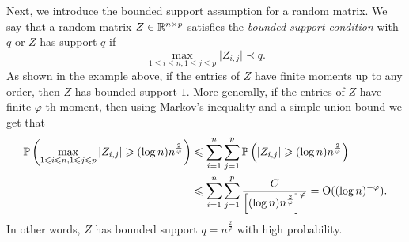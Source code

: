 
Next, we introduce the bounded support assumption for a random matrix.
We say that a random matrix $Z \in\mathbb{R}^{n \times p}$ satisfies the {\it{bounded support condition}} with $q$ or $Z$ has support $q$ if
\begin{equation}
	\max_{1\le i \le n, 1 \le j \le p}\vert Z_{i, j} \vert \prec q. \label{eq_support}
\end{equation}
As shown in the example above, if the entries of $Z$ have finite moments up to any order, then $Z$ has bounded support $1$.
More generally, if the entries of $Z$ have finite $\varphi$-th moment, then using Markov's inequality and a simple union bound we get that %
\begin{align}
	\mathbb{P}\left(\max_{1\leqslant i\leqslant n, 1\leqslant j \leqslant p}|Z_{i, j}|\geqslant (\log n) n^{\frac{2}{\varphi}}\right) &\leqslant \sum_{i=1}^n \sum_{j=1}^p \mathbb{P}\left(|Z_{i, j}|\geqslant (\log n) n^{\frac{2}{\varphi}}\right)  \nonumber\\
	&\leqslant \sum_{i=1}^n \sum_{j=1}^p \frac{C}{\left[(\log n) n^{\frac{2}{\varphi}}\right]^\varphi} = \operatorname{O}((\log n)^{-\varphi}).\label{Ptrunc}
	\end{align}
In other words, $Z$ has bounded support $q=n^{\frac{2}{\varphi}}$ with high probability.
